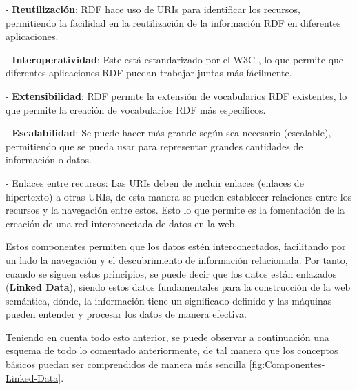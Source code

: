 \documentclass[11pt]{report}
\begin{document}
\indent \indent \indent - \textbf{Reutilización}: RDF hace uso de URIs para identificar los recursos, permitiendo la facilidad en la reutilización de la información RDF en diferentes aplicaciones.

\indent \indent \indent - \textbf{Interoperatividad}: Este está estandarizado por el W3C \cite{5}, lo que permite que diferentes aplicaciones RDF puedan trabajar juntas más fácilmente.

\indent \indent \indent - \textbf{Extensibilidad}: RDF permite la extensión de vocabularios RDF existentes, lo que permite la creación de vocabularios RDF más específicos.

\indent \indent \indent - \textbf{Escalabilidad}: Se puede hacer más grande según sea necesario (escalable),  permitiendo que se pueda usar para representar grandes cantidades de información o datos.

- Enlaces entre recursos: Las URIs deben de incluir enlaces (enlaces de hipertexto) a otras URIs, de esta manera se pueden establecer relaciones entre los recursos y la navegación entre estos. Esto lo que permite es la fomentación de la creación de una red interconectada de datos en la web.

Estos componentes permiten que los datos estén interconectados, facilitando por un lado la navegación y el descubrimiento de información relacionada. Por tanto, cuando se siguen estos principios, se puede decir que los datos están enlazados (\textbf{Linked Data}), siendo estos datos fundamentales para la construcción de la web semántica, dónde, la información tiene un significado definido y las máquinas pueden entender y procesar los datos de manera efectiva.

Teniendo en cuenta todo esto anterior, se puede observar a continuación una esquema de todo lo comentado anteriormente, de tal manera que los conceptos básicos puedan ser comprendidos de manera más sencilla \ref{fig:Componentes-Linked-Data}.
\end{document}
